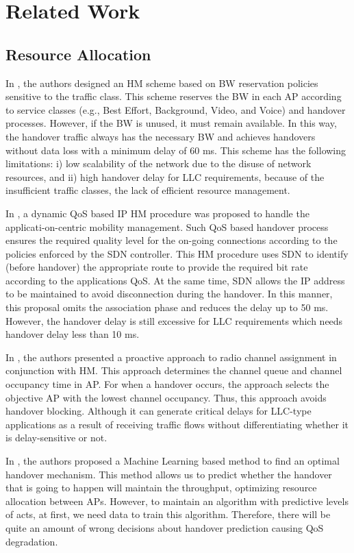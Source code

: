 \section{Related Work}
\label{sec:relativework}

\subsection{Resource Allocation}

In \cite{209-27}, the authors designed an HM scheme based on BW reservation policies sensitive to the traffic class. This scheme reserves the BW in each AP according to service classes (e.g., Best Effort, Background, Video, and Voice) and handover processes. However, if the BW is unused, it must remain available. In this way, the handover traffic always has the necessary BW and achieves handovers without data loss with a minimum delay of 60 ms. This scheme has the following limitations: i) low scalability of the network due to the disuse of network resources, and ii) high handover delay for LLC requirements, because of the insufficient traffic classes, the lack of efficient resource management.

In \cite{125}, a dynamic QoS based IP HM procedure was proposed to handle the applicati-on-centric mobility management. Such QoS based handover process ensures the required quality level for the on-going connections according to the policies enforced by the SDN controller. This HM procedure uses SDN to identify (before handover) the appropriate route to provide the required bit rate according to the applications QoS. At the same time, SDN allows the IP address to be maintained to avoid disconnection during the handover. In this manner, this proposal omits the association phase and reduces the delay up to 50 ms. However, the handover delay is still excessive for LLC requirements which needs handover delay less than 10 ms.

In \cite{127}, the authors presented a proactive approach to radio channel assignment in conjunction with HM. This approach determines the channel queue and channel occupancy time in AP. For when a handover occurs, the approach selects the objective AP with the lowest channel occupancy. Thus, this approach avoids handover blocking. Although it can generate critical delays for LLC-type applications as a result of receiving traffic flows without differentiating whether it is delay-sensitive or not.

In \cite{a131}, the authors proposed a Machine Learning based method to find an optimal handover mechanism. This method allows us to predict whether the handover that is going to happen will maintain the throughput, optimizing resource allocation between APs. However, to maintain an algorithm with predictive levels of acts, at first, we need data to train this algorithm. Therefore, there will be quite an amount of wrong decisions about handover prediction causing QoS degradation.

